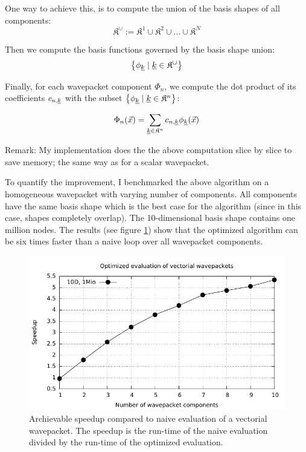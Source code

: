 \documentclass{article}
\begin{document}
One way to achieve this, is to compute the union of the
basis shapes of all components:
\[
\mathfrak{K}^{\cup} := \mathfrak{K}^1 \cup \mathfrak{K}^2 \cup \dots \cup \mathfrak{K}^N
\]

Then we compute the basis functions governed by the basis shape union:
\[
\left\{\phi_{\underline{k}} \;|\;\underline{k} \in \mathfrak{K}^{\cup}\right\}
\]

Finally, for each wavepacket component \(\Phi_n\),
we compute the dot product of its coefficients \(c_{n,\underline{k}}\)
with the subset \(\left\{\phi_{\underline{k}}\;|\; \underline{k} \in \mathfrak{K}^n\right\}\):

\[
\Phi_n(\vec{x})=\sum_{\underline{k} \in \mathfrak{K}^n} c_{n,\underline{k}} \phi_{\underline{k}}(\vec{x})
\]

Remark: My implementation does the the above computation slice by slice to save memory;
the same way as for a scalar wavepacket.

To quantify the improvement, I benchmarked the above algorithm on a homogeneous wavepacket with
varying number of components. All components have the same basis shape which is
the best case for the algorithm (since in this case, shapes completely overlap).
The 10-dimensional basis shape contains one million nodes.
The results (see figure \ref{fig:hawp_homogen_evaluation_speedup}) show that the
optimized algorithm can be six times faster than a naive loop over all
wavepacket components.

\begin{figure}[H]
  \centering
  \includegraphics[width=1.0\textwidth]{plots/hawp_eval_homogen_speedup}
  \caption{
    Archievable speedup compared to naive evaluation of a vectorial wavepacket.
    The speedup is the run-time of the naive evaluation divided by the run-time of
    the optimized evaluation.
  }
  \label{fig:hawp_homogen_evaluation_speedup}
\end{figure}
\end{document}
